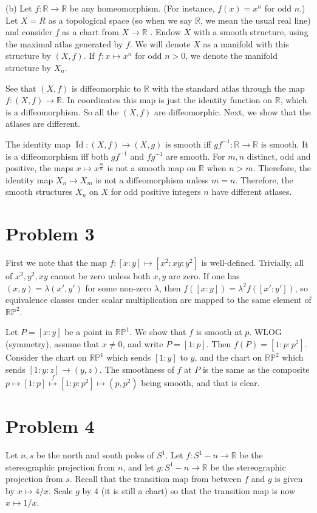 \documentclass{amsart}
\numberwithin{equation}{section}
\theoremstyle{plain}
\theoremstyle{definition}
\theoremstyle{remark}
\newcommand{\id}{\operatorname{Id}}
\renewcommand{\_}[2]{\underbrace{#1}_{#2}}
\renewcommand{\^}[2]{\overbrace{#1}_{#2}}
\newcommand{\R}{\mathbb{R}}
\renewcommand{\P}{\mathbb{P}}
\begin{document}
(b) Let $f: \R \to \R$ be any homeomorphism. (For instance, $f(x) = x^n$ for odd $n$.) Let $X = R$ as a topological space (so when we say $\R$, we mean the usual real line) and consider $f$ as a chart from $X \to \R$ . Endow $X$ with a smooth structure, using the maximal atlas generated by $f$. We will denote $X$ as a manifold with this structure by $(X,f)$. If $f: x\mapsto x^n$ for odd $n>0$, we denote the manifold structure by $X_n$.

See that $(X,f)$ is diffeomorphic to $\R$ with the standard atlas through the map $f: (X,f) \to \R$. In coordinates this map is just the identity function on $\R$, which is a diffeomorphism. So all the $(X,f)$ are diffeomorphic. Next, we show that the atlases are different.

The identity map $\id: (X,f) \to (X,g)$ is smooth iff $gf^{-1}: \R \to \R$ is smooth. It is a diffeomorphism iff both $gf^{-1}$ and $fg^{-1}$ are smooth. For $m,n$ distinct, odd and positive, the maps $x \mapsto x^{\frac m n}$ is not a smooth map on $\R$ when $n > m$. Therefore, the identity map $X_n \to X_m$ is not a diffeomorphism unless $m = n$. Therefore, the smooth structures $X_n$ on $X$ for odd positive integers $n$ have different atlases.

\section*{Problem 3}
First we note that the map $f: [x:y] \mapsto [x^2: xy : y^2]$ is well-defined. Trivially, all of $x^2,y^2,xy$ cannot be zero unless both $x,y$ are zero. If one has $(x,y) = \lambda (x',y')$ for some non-zero $\lambda$, then $f([x:y]) = \lambda^2 f([x':y'])$, so equivalence classes under scalar multiplication are mapped to the same element of $\R\P^2$. 

Let $P = [x:y]$ be a point in $\R\P^1$. We show that $f$ is smooth at $p$. WLOG (symmetry), assume that $x \neq 0$, and write $P = [1:p]$. Then $f(P) = [1:p:p^2]$. Consider the chart on $\R\P^1$ which sends $[1:y]$ to $y$, and the chart on $\R\P^2$ which sends $[1:y:z] \to (y,z)$. The smoothness of $f$ at $P$ is the same as the composite $p \mapsto [1:p] \stackrel{f}{\mapsto} [1:p:p^2] \mapsto (p,p^2)$ being smooth, and that is clear. 

\section*{Problem 4}
Let $n, s$ be the north and south poles of $S^1$. Let $f: S^1 - n \to \R$ be the stereographic projection from $n$, and let $g: S^1 - n \to \R$ be the stereographic projection from $s$. Recall that the transition map from between $f$ and $g$ is given by $x \mapsto 4/x$. Scale $g$ by $4$ (it is still a chart) so that the transition map is now $x \mapsto 1/x$.
\end{document}
